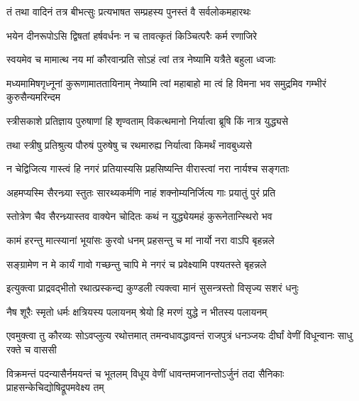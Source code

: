 \twolineshloka
{तं तथा वादिनं तत्र बीभत्सुः प्रत्यभाषत}
{सम्प्रहस्य पुनस्तं वै सर्वलोकमहारथः}


\twolineshloka
{भयेन दीनरूपोऽसि द्विषतां हर्षवर्धनः}
{न च तावत्कृतं किञ्चित्परैः कर्म रणाजिरे}


\twolineshloka
{स्वयमेव च मामात्थ नय मां कौरवान्प्रति}
{सोऽहं त्वां तत्र नेष्यामि यत्रैते बहुला ध्वजाः}


\threelineshloka
{मध्यमामिषगृध्नूनां कुरूणामाततायिनाम्}
{नेष्यामि त्वां महाबाहो मा त्वं हि विमना भव}
{समुद्रमिव गम्भीरं कुरुसैन्यमरिन्दम}


\twolineshloka
{स्त्रीसकाशे प्रतिज्ञाय पुरुषाणां हि शृण्वताम्}
{विकत्थमानो निर्यात्वा ब्रूषि किं नात्र युद्ध्यसे}


\twolineshloka
{तथा स्त्रीषु प्रतिश्रुत्य पौरुषं पुरुषेषु च}
{रथमारुह्य निर्यात्वा किमर्थं नावबुध्यसे}


\twolineshloka
{न चेद्विजित्य गास्त्वं हि नगरं प्रतियास्यसि}
{प्रहसिष्यन्ति वीरास्त्वां नरा नार्यश्च सङ्गताः}


\twolineshloka
{अहमप्यस्मि सैरन्ध्र्या स्तुतः सारथ्यकर्मणि}
{नाहं शक्नोम्यनिर्जित्य गाः प्रयातुं पुरं प्रति}


\twolineshloka
{स्तोत्रेण चैव सैरन्ध्र्यास्तव वाक्येन चोदितः}
{कथं न युद्ध्येयमहं कुरूनेतान्स्थिरो भव}




\twolineshloka
{कामं हरन्तु मात्स्यानां भूयांसः कुरवो धनम्}
{प्रहसन्तु च मां नार्यो नरा वाऽपि बृहन्नले}


\twolineshloka
{सङ्ग्रामेण न मे कार्यं गावो गच्छन्तु चापि मे}
{नगरं च प्रवेक्ष्यामि पश्यतस्ते बृहन्नले}



\twolineshloka
{इत्युक्त्वा प्राद्रवद्भीतो रथात्प्रस्कन्द्य कुण्डली}
{त्यक्त्वा मानं सुसन्त्रस्तो विसृज्य सशरं धनुः}




\twolineshloka
{नैष शूरैः स्मृतो धर्मः क्षत्रियस्य पलायनम्}
{श्रेयो हि मरणं युद्धे न भीतस्य पलायनम्}



\threelineshloka
{एवमुक्त्वा तु कौरव्यः सोऽवप्लुत्य रथोत्तमात्}
{तमन्वधावद्धावन्तं राजपुत्रं धनञ्जयः}
{दीर्घां वेणीं विधून्वानः साधु रक्ते च वाससी}


\threelineshloka
{विक्रमन्तं पदन्यासैर्नमयन्तं च भूतलम्}
{विधूय वेणीं धावन्तमजानन्तोऽर्जुनं तदा}
{सैनिकाः प्राहसन्केचिद्योषिद्रूपमवेक्ष्य तम्}


